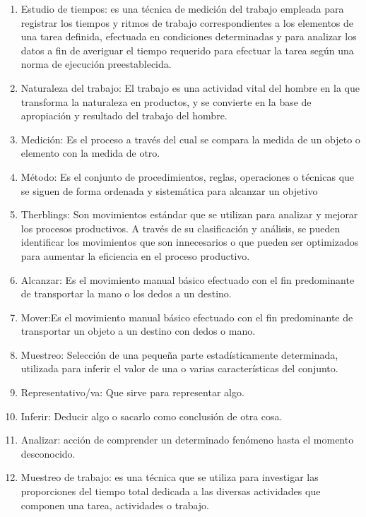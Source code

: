 \begin{enumerate}
    \cite{RAE}
    \item Estudio de tiempos: es una técnica de medición del trabajo empleada para registrar los tiempos y ritmos de trabajo correspondientes a los elementos de una tarea definida, efectuada en condiciones determinadas y para analizar los datos a fin de averiguar el tiempo requerido para efectuar la tarea según una norma de ejecución preestablecida.
    \cite{RAE}
    \item Naturaleza del trabajo: El trabajo es una actividad vital del hombre en la que transforma la naturaleza en productos, y se convierte en la base de apropiación y resultado del trabajo del hombre.
    \cite{RAE}
    \item Medición: Es el proceso a través del cual se compara la medida de un objeto o elemento con la medida de otro.
    \cite{RAE}
    \item Método: Es el conjunto de procedimientos, reglas, operaciones o técnicas que se siguen de forma ordenada y sistemática para alcanzar un objetivo
    \cite{book}
    \item Therblings: Son movimientos estándar que se utilizan para analizar y mejorar los procesos productivos. A través de su clasificación y análisis, se pueden identificar los movimientos que son innecesarios o que pueden ser optimizados para aumentar la eficiencia en el proceso productivo.
    \cite{book}
    \item Alcanzar: Es el movimiento manual básico efectuado con el fin predominante de transportar la mano o los dedos a un destino.
    \cite{RAE}
    \item Mover:Es el movimiento manual básico efectuado con el fin predominante de transportar un objeto a un destino con dedos o mano.
    \cite{RAE}
    \item Muestreo: Selección de una pequeña parte estadísticamente determinada, utilizada para inferir el valor de una o varias características del conjunto.
    \cite{RAE}
    \item Representativo/va: Que sirve para representar algo.
    \cite{RAE}
    \item Inferir: Deducir algo o sacarlo como conclusión de otra cosa.
    \cite{RAE}
    \item Analizar: acción de comprender un determinado fenómeno hasta el momento desconocido.
    \cite{RAE}
    \item Muestreo de trabajo: es una técnica que se utiliza para investigar las proporciones del tiempo total dedicada a las diversas actividades que componen una tarea, actividades o trabajo.

\end{enumerate}
